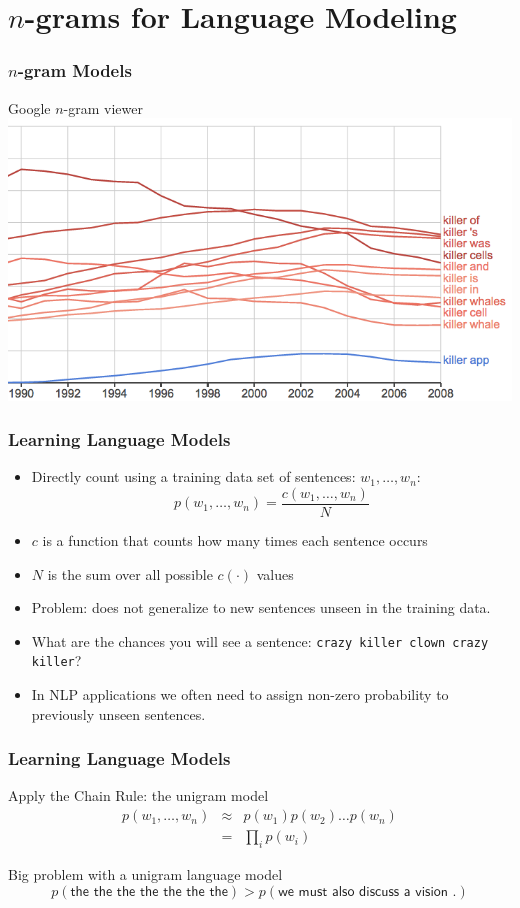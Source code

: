 \section{$n$-grams for Language Modeling}
\frame{\tableofcontents[currentsection]}

\begin{frame}
\frametitle{$n$-gram Models}
\centering
\begin{block}{Google $n$-gram viewer}
\includegraphics[scale=0.45]{figures/killer-ngrams.png}
\end{block}
\end{frame}

\begin{frame}
\frametitle{Learning Language Models}
\begin{itemize}[<+->]
\item Directly count using a training data set of sentences: $w_1, \ldots, w_n$:
\[ p(w_1, \ldots, w_n) = \frac{c(w_1, \ldots, w_n)}{N} \]
\item $c$ is a function that counts how many times each sentence occurs
\item $N$ is the sum over all possible $c(\cdot)$ values
\item Problem: does not generalize to new sentences unseen in the training data.
\item What are the chances you will see a sentence: \texttt{crazy killer clown crazy killer}?
\item In NLP applications we often need to assign non-zero probability to previously unseen sentences.
\end{itemize}
\end{frame}

\begin{frame}
\frametitle{Learning Language Models}
\begin{block}{Apply the Chain Rule: the unigram model}
\begin{eqnarray*}
p(w_1, \ldots, w_n) &\approx& p(w_1) p(w_2) \ldots p(w_n) \\
&=& \prod_i p(w_i)
\end{eqnarray*}
\end{block}
\pause
\begin{block}{Big problem with a unigram language model}
\[ p(\textsf{the the the the the the the}) > p(\textsf{we must also discuss a vision .}) \]
\end{block}

\end{frame}


